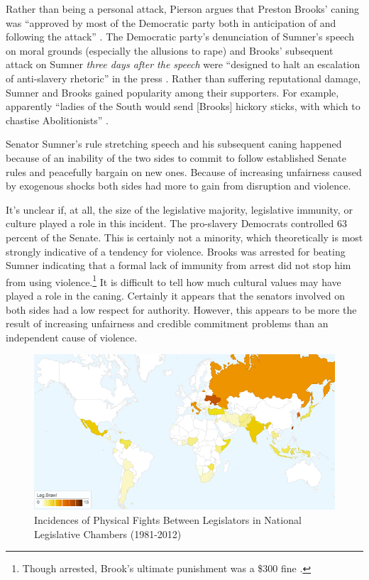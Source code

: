 \documentclass[a4paper]{article}\usepackage[]{graphicx}\usepackage[]{color}
\begin{document}
Rather than being a personal attack, Pierson argues that Preston Brooks' caning was ``approved by most of the Democratic party both in anticipation of and following the attack'' \cite[553]{Pierson1995}. The Democratic party's denunciation of Sumner's speech on moral grounds (especially the allusions to rape) and Brooks' subsequent attack on Sumner \emph{three days after the speech} were ``designed to halt an escalation of anti-slavery rhetoric'' in the press \cite[553]{Pierson1995}. Rather than suffering reputational damage, Sumner and Brooks gained popularity among their supporters. For example, apparently ``ladies of the South would send [Brooks] hickory sticks, with which to chastise Abolitionists'' \cite[255]{Donald2009}.

Senator Sumner's rule stretching speech and his subsequent caning happened because of an inability of the two sides to commit to follow established Senate rules and peacefully bargain on new ones. Because of increasing unfairness caused by exogenous shocks both sides had more to gain from disruption and violence.

It's unclear if, at all, the size of the legislative majority, legislative immunity, or culture played a role in this incident. The pro-slavery Democrats controlled 63 percent of the Senate. This is certainly not a minority, which theoretically is most strongly indicative of a tendency for violence. Brooks was arrested for beating Sumner indicating that a formal lack of immunity from arrest did not stop him from using violence.\footnote{Though arrested, Brook's ultimate punishment was a \$300 fine \cite[59]{Wolfe2004}.} It is difficult to tell how much cultural values may have played a role in the caning. Certainly it appears that the senators involved on both sides had a low respect for authority. However, this appears to be more the result of increasing unfairness and credible commitment problems than an independent cause of violence.

\begin{figure}[h!]
    \centering
    \caption{Incidences of Physical Fights Between Legislators in National Legislative Chambers (1981-2012)}
    \label{leg_map}
        \includegraphics[width = 13cm]{incidence_map.png}
\end{figure}
\end{document}
